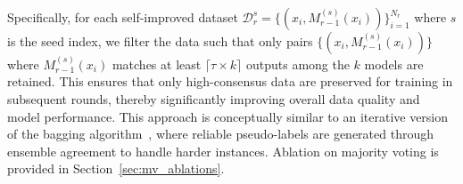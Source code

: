 Specifically, for each self-improved dataset \( \mathcal{D}_r^{s} = \{(x_i, M_{r-1}^{(s)}(x_i))\}_{i=1}^{N_r} \) where $s$ is the seed index, we filter the data such that only pairs \( \{(x_i, M_{r-1}^{(s)}(x_i))\} \) where \( M_{r-1}^{(s)}(x_i) \) matches at least \( \lceil \tau \times k \rceil \) outputs among the \( k \) models are retained. This ensures that only high-consensus data are preserved for training in subsequent rounds, thereby significantly improving overall data quality and model performance. This approach is conceptually similar to an iterative version of the bagging algorithm~\citep{breiman1996bagging}, where reliable pseudo-labels are generated through ensemble agreement to handle harder instances. Ablation on majority voting is provided in Section~\ref{sec:mv_ablations}. 





